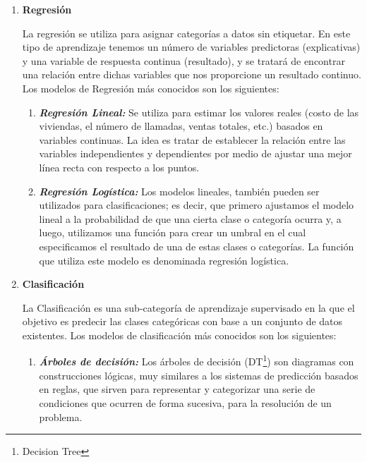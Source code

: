 \begin{enumerate}[label=\textbf{\arabic*})]
	
	\item \textbf{Regresión}
	
	La regresión se utiliza para asignar categorías a datos sin etiquetar. En este tipo de aprendizaje tenemos un número de variables predictoras (explicativas) y una variable de respuesta continua (resultado), y se tratará de encontrar una relación entre dichas variables que nos proporcione un resultado continuo\cite{Roman2019}. Los modelos de Regresión más conocidos son los siguientes:
	\begin{enumerate}[label=\textbf{(\alph*)}]
		\item \textit{\textbf{Regresión Lineal:}}
		Se utiliza para estimar los valores reales (costo de las viviendas, el número de llamadas, ventas totales, etc.) basados en variables continuas. La idea es tratar de establecer la relación entre las variables independientes y dependientes por medio de ajustar una mejor línea recta con respecto a los puntos\cite{BriegaLopez2015}. 
		
		\item \textit{\textbf{Regresión Logística:}}
		Los modelos lineales, también pueden ser utilizados para clasificaciones; es decir, que primero ajustamos el modelo lineal a la probabilidad de que una cierta clase o categoría ocurra y, a luego, utilizamos una función para crear un umbral en el cual especificamos el resultado de una de estas clases o categorías. La función que utiliza este modelo es denominada regresión logística\cite{BriegaLopez2015}.  
	\end{enumerate}
	
	\newpage
	\item \textbf{Clasificación}
	
	La Clasificación es una sub-categoría de aprendizaje supervisado en la que el objetivo es predecir las clases categóricas con base a un conjunto de datos existentes\cite{BriegaLopez2015}. Los modelos de clasificación más conocidos son los siguientes:
	
	\begin{enumerate}[label=\textbf{(\alph*)}]
		\item \textit{\textbf{Árboles de decisión:}}
		Los árboles de decisión (DT\footnote{Decision Tree}) son diagramas con construcciones lógicas, muy similares a los sistemas de predicción basados en reglas, que sirven para representar y categorizar una serie de condiciones que ocurren de forma sucesiva, para la resolución de un problema\cite{Roman2019}. 
		

\end{enumerate}
\end{enumerate}
